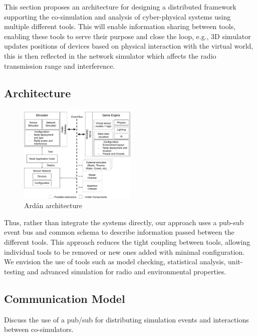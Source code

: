 This section proposes an architecture for designing a distributed framework supporting the co-simulation and analysis of cyber-physical systems using multiple different tools.
This will enable information sharing between tools, enabling these tools to serve their purpose and close the loop, e.g., 3D simulator updates positions of devices based on physical interaction with the virtual world, this is then reflected in the network simulator which affects the radio transmission range and interference.



\subsection{Architecture} %
\label{sub:architecture}

\begin{figure}[ht]
\centering
  \includegraphics[width=0.5\textwidth]{./imgs/architecture}
  \caption{Ard\'{a}n architecture}
  \label{fig:architecture}
\end{figure}


Thus, rather than integrate the systems directly, our approach uses a pub-sub event bus and common schema to describe information passed between the different tools. This approach reduces the tight coupling between tools, allowing individual tools to be removed or new ones added with minimal configuration. We envision the use of tools such as model checking, statistical analysis, unit-testing and advanced simulation for radio and environmental properties.


\subsection{Communication Model} %
\label{sub:communication_model}

Discuss the use of a pub/sub for distributing simulation events and interactions between co-simulators.

